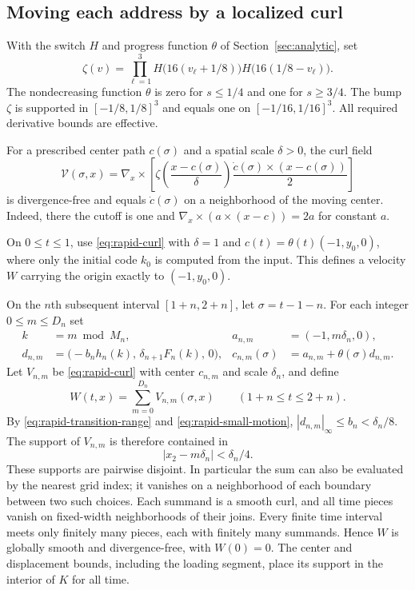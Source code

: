 \subsection{Moving each address by a localized curl}
With the switch $H$ and progress function $\theta$ of Section~\ref{sec:analytic}, set
\[
 \zeta(v)=\prod_{\ell=1}^3
   H\bigl(16(v_\ell+1/8)\bigr)
   H\bigl(16(1/8-v_\ell)\bigr).
\]
The nondecreasing function $\theta$ is zero for $s\leq1/4$ and one for
$s\geq3/4$.  The bump $\zeta$ is supported in $[-1/8,1/8]^3$ and equals
one on $[-1/16,1/16]^3$.  All required derivative bounds are effective.

For a prescribed center path $c(\sigma)$ and a spatial scale $\delta>0$,
the curl field
\begin{equation}
 \mathcal V(\sigma,x)=
 \nabla_x\times\left[
  \zeta\left(\frac{x-c(\sigma)}{\delta}\right)
  \frac{\dot c(\sigma)\times(x-c(\sigma))}{2}
 \right]
 \label{eq:rapid-curl}
\end{equation}
is divergence-free and equals $\dot c(\sigma)$ on a neighborhood of the
moving center.  Indeed, there the cutoff is one and
$\nabla_x\times(a\times(x-c))=2a$ for constant $a$.

On $0\leq t\leq1$, use \eqref{eq:rapid-curl} with
$\delta=1$ and $c(t)=\theta(t)(-1,y_0,0)$, where only the initial code
$k_0$ is computed from the input.  This defines a velocity $W$ carrying
the origin exactly to $(-1,y_0,0)$.

On the $n$th subsequent interval $[1+n,2+n]$, let $\sigma=t-1-n$.
For each integer $0\leq m\leq D_n$ set
\begin{align}
 k&=m\bmod M_n,&
 a_{n,m}&=(-1,m\delta_n,0),\\
 d_{n,m}&=\bigl(-b_n h_n(k),\,\delta_{n+1}F_n(k),\,0\bigr),&
 c_{n,m}(\sigma)&=a_{n,m}+\theta(\sigma)d_{n,m}.
 \label{eq:rapid-address-motion}
\end{align}
Let $V_{n,m}$ be \eqref{eq:rapid-curl} with center $c_{n,m}$ and scale
$\delta_n$, and define
\begin{equation}
 W(t,x)=\sum_{m=0}^{D_n}V_{n,m}(\sigma,x)
 \qquad(1+n\leq t\leq2+n).
 \label{eq:rapid-field}
\end{equation}
By \eqref{eq:rapid-transition-range} and \eqref{eq:rapid-small-motion},
$|d_{n,m}|_\infty\leq b_n<\delta_n/8$.  The support of $V_{n,m}$ is
therefore contained in
\[
 |x_2-m\delta_n|<\delta_n/4.
\]
These supports are pairwise disjoint.  In particular the sum can also be
evaluated by the nearest grid index; it vanishes on a neighborhood of
each boundary between two such choices.  Each summand is a smooth curl,
and all time pieces vanish on fixed-width neighborhoods of their joins.
Every finite time interval meets only finitely many pieces, each with
finitely many summands.  Hence $W$ is globally smooth and divergence-free,
with $W(0)=0$.  The center and displacement bounds, including the loading
segment, place its support in the interior of $K$ for all time.


